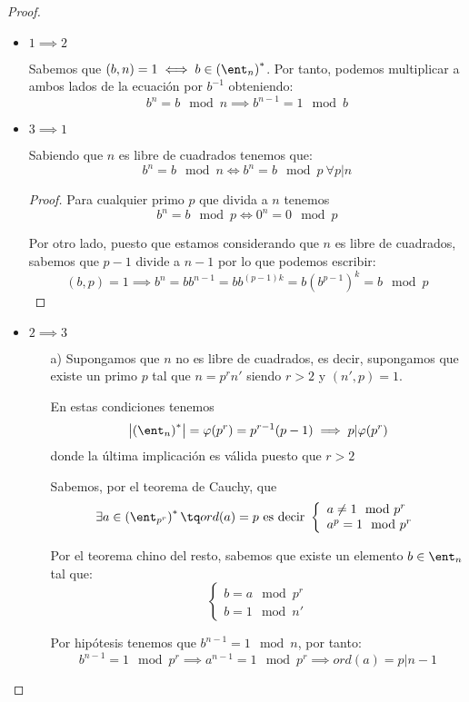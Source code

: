 \begin{proof}
\begin{itemize}
\item $1 \implies 2$

Sabemos que $(b,n)=1 \iff b \in\left(\ent_n\right)^*$. Por tanto, podemos multiplicar a ambos lados de la ecuación por $b^{-1}$ obteniendo:
\[b^n = b \mod n \implies b^{n-1}=1 \mod b\]

\item $3 \implies 1$

Sabiendo que $n$ es libre de cuadrados tenemos que:
\[b^n = b \mod n \iff b^n = b \mod p \ \forall p|n\]

\begin{proof}
Para cualquier primo $p$ que divida a $n$ tenemos
\[b^n = b \mod p \iff 0^n=0 \mod p \]

Por otro lado, puesto que estamos considerando que $n$ es libre de cuadrados, sabemos que $p-1$ divide a $n-1$ por lo que podemos escribir:
\[(b,p)=1 \implies b^n=bb^{n-1} = bb^{(p-1)k}=b\left(b^{p-1}\right)^k=b\mod p\]
\end{proof}

\item $2 \implies 3$

\begin{itemize}
\item[a)] Supongamos que $n$ no es libre de cuadrados, es decir, supongamos que existe un primo $p$ tal que $n=p^rn'$ siendo $r>2$ y $(n',p)=1$.

En estas condiciones tenemos
\[\left| \left(\ent_n\right)^*\right| = \varphi(p^r)=p^{r-1}(p-1) \implies p|\varphi(p^r)\]
donde la última implicación es válida puesto que $r>2$

Sabemos, por el teorema de Cauchy, que
\[\exists a \in \left(\ent_{p^r}\right)^* \tq ord(a)=p \text{ es decir } \left\{\begin{array}{l}a\neq 1 \mod p^r \\ a^p=1 \mod p^r \end{array}\right.\]

Por el teorema chino del resto, sabemos que existe un elemento $b \in \ent_n$ tal que:
\[\left\{\begin{array}{l}b=a\mod p^r \\ b=1 \mod n' \end{array}\right.\]

Por hipótesis tenemos que $b^{n-1}=1 \mod n$, por tanto:
\[b^{n-1} = 1 \mod p^r \implies a^{n-1} = 1 \mod p^r \implies ord(a) =p|n-1\]


\end{itemize}
\end{itemize}
\end{proof}
